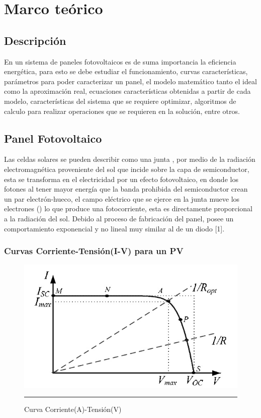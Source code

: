\chapter{Marco teórico}
\label{ch:marco}

\section{Descripción}

En un sistema de paneles fotovoltaicos es de suma importancia la eficiencia energética, para esto se debe estudiar el funcionamiento, curvas características, parámetros para poder caracterizar un panel, el modelo matemático tanto el ideal como la aproximación real, ecuaciones características obtenidas a partir de cada modelo, características del sistema que se requiere optimizar, algoritmos de calculo para realizar operaciones que se requieren en la solución, entre otros.

\section{Panel Fotovoltaico}

Las celdas solares se pueden describir como una junta , por medio de la radiación electromagnética proveniente del sol que incide sobre la capa de semiconductor, esta se transforma en el electricidad por un efecto fotovoltaico, en donde los fotones al tener mayor energía que la banda prohibida del semiconductor crean un par electrón-hueco, el campo eléctrico que se ejerce en la junta  mueve los electrones () lo que produce una fotocorriente, esta es directamente proporcional a la radiación del sol. Debido al proceso de fabricación del panel, posee un comportamiento exponencial y no lineal muy similar al de un diodo [1]. 

\subsection{Curvas Corriente-Tensión(I-V) para un PV }

\begin{figure}[H]
  \centering
    \includegraphics[scale=0.6]{./IV.jpg}
    \rule{35em}{0.5pt}
  \caption[Curva Corriente(A)-Tensión(V)]{Curva Corriente(A)-Tensión(V) }
  \label{fig:Curva_PV}
\end{figure}


